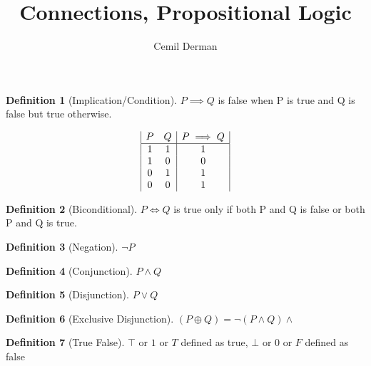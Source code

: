 \documentclass{article}
\title{Connections, Propositional Logic}
\author{Cemil Derman}
\theoremstyle{definition}
\newtheorem{definition}{Definition}[section]
\begin{document}
    \maketitle
    \begin{definition}[Implication/Condition]
      $P \implies Q$  is false when P is true and Q is false but true otherwise.

        \begin{displaymath}
       \begin{array}{|c c|c|}
         P & Q & P \implies Q \\
         \hline
        1 & 1 & 1 \\ 
        1 & 0 & 0 \\ %
        0 & 1 & 1 \\ 
        0 & 0 & 1 
         
       \end{array}
     \end{displaymath}


    \end{definition}
    \begin{definition}[Biconditional]
      $P \iff{Q}$ is true only if both P and Q is false or both P and Q is true.
    
    \end{definition}
    
    \begin{definition}[Negation]
      $\neg P$
    \end{definition}

    \begin{definition}[Conjunction]
   $P \wedge Q$
      
    \end{definition}


    \begin{definition}[Disjunction]
      $P \lor Q$
      
    \end{definition}

    \begin{definition}[Exclusive Disjunction]
      $(P \oplus Q) = \neg(P \wedge Q) \wedge $ %

    \end{definition}

    \begin{definition}[True False]
      $\top$ or $1$ or $T$ defined as true, 
      $\bot$ or $0$ or $F$ defined as false
      
    \end{definition}
\end{document}
